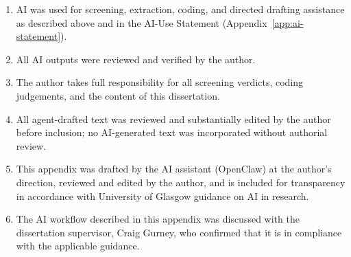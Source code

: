 \begin{enumerate}
  \item AI was used for screening, extraction, coding, and directed drafting assistance as described above and in the AI-Use Statement (Appendix~\ref{app:ai-statement}).
  \item All AI outputs were reviewed and verified by the author.
  \item The author takes full responsibility for all screening verdicts, coding judgements, and the content of this dissertation.
  \item All agent-drafted text was reviewed and substantially edited by the author before inclusion; no AI-generated text was incorporated without authorial review.
  \item This appendix was drafted by the AI assistant (OpenClaw) at the author's direction, reviewed and edited by the author, and is included for transparency in accordance with University of Glasgow guidance on AI in research.
  \item The AI workflow described in this appendix was discussed with the dissertation supervisor, Craig Gurney, who confirmed that it is in compliance with the applicable guidance.
\end{enumerate}
